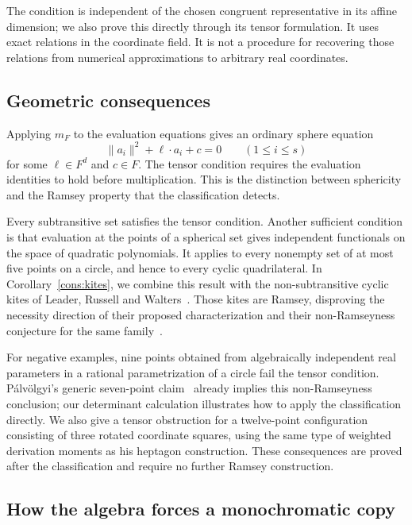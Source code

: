 The condition is independent of the chosen congruent representative
in its affine dimension; we also prove this directly through its tensor
formulation. It uses exact relations in the coordinate field. It is
not a procedure for recovering those relations from numerical
approximations to arbitrary real coordinates.

\subsection{Geometric consequences}

Applying $m_F$ to the evaluation equations gives an ordinary sphere
equation
\[
 \|a_i\|^2+\ell\cdot a_i+c=0\qquad(1\le i\le s)
\]
for some $\ell\in F^d$ and $c\in F$. The tensor condition requires the
evaluation identities to hold before multiplication. This is the
distinction between sphericity and the Ramsey property that the
classification detects.

Every subtransitive set satisfies the tensor condition. Another
sufficient condition is that evaluation at the points of a spherical
set gives independent functionals on the space of quadratic
polynomials. It applies to every nonempty set of at most five points
on a circle, and hence to every cyclic quadrilateral. In
Corollary~\ref{cons:kites}, we combine this result with the
non-subtransitive cyclic kites of Leader, Russell and
Walters~\cite[Corollary~2]{lrw-kites}. Those kites are Ramsey, disproving
the necessity direction of their proposed characterization and their
non-Ramseyness conjecture for the same family~\cite[Conjecture~3]{lrw-kites}.

For negative examples, nine points obtained from algebraically
independent real parameters in a rational parametrization of a circle
fail the tensor condition. P\'alv\"olgyi's generic seven-point
claim~\cite[Theorem~A.3]{palvolgyi-heptagon} already implies this
non-Ramseyness conclusion; our determinant calculation illustrates
how to apply the classification directly. We also give a tensor
obstruction for a twelve-point configuration consisting of three
rotated coordinate squares, using the same type of weighted derivation
moments as his heptagon construction. These consequences are proved
after the classification and require no further Ramsey construction.

\subsection{How the algebra forces a monochromatic copy}

